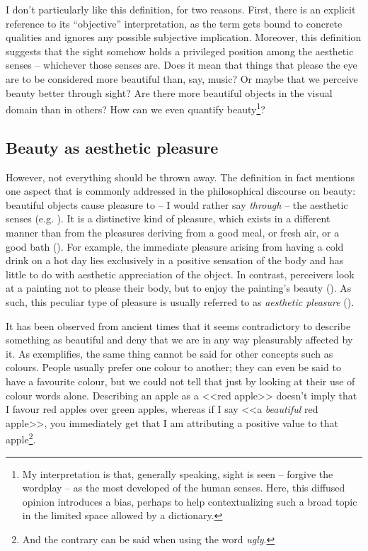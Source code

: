 I don't particularly like this definition, for two reasons. First, there is an explicit reference to its ``objective'' interpretation, as the term gets bound to concrete qualities and ignores any possible subjective implication. Moreover, this definition suggests that the sight somehow holds a privileged position among the aesthetic senses -- whichev\-er those senses are. Does it mean that things that please the eye are to be considered more beautiful than, say, music? Or maybe that we perceive beauty better through sight? Are there more beautiful objects in the visual domain than in others? How can we even quantify beauty\footnote{My interpretation is that, generally speaking, sight is seen -- forgive the wordplay -- as the most developed of the human senses. Here, this diffused opinion introduces a bias, perhaps to help contextualizing such a broad topic in the limited space allowed by a dictionary.}?

\subsection{Beauty as aesthetic pleasure}\label{subsec:pleasure}
However, not everything should be thrown away. The definition in fact mentions one aspect that is commonly addressed in the philosophical discourse on beauty: beautiful objects cause pleasure to -- I would rather say \emph{through} -- the aesthetic senses (e.g. \cite{tatarkiewicz2006history}). It is a distinctive kind of pleasure, which exists in a different manner than from the pleasures deriving from a good meal, or fresh air, or a good bath (\cite{ingarden1964artistic}). For example, the immediate pleasure arising from having a cold drink on a hot day lies exclusively in a positive sensation of the body and has little to do with aesthetic appreciation of the object. In contrast, perceivers look at a painting not to please their body, but to enjoy the painting's beauty (\cite{reber2004processing}). As such, this peculiar type of pleasure is usually referred to as \emph{aesthetic pleasure} (\cite{graham2005philosophy}).

It has been observed from ancient times that it seems contradictory to describe something as beautiful and deny that we are in any way pleasurably affected by it. As \citeauthor{graham2005philosophy} exemplifies, the same thing cannot be said for other concepts such as colours. People usually prefer one colour to another; they can even be said to have a favourite colour, but we could not tell that just by looking at their use of colour words alone. Describing an apple as a <<red apple>> doesn't imply that I favour red apples over green apples, whereas if I say <<a \emph{beautiful} red apple>>, you immediately get that I am attributing a positive value to that apple\footnote{And the contrary can be said when using the word \emph{ugly}.}.

